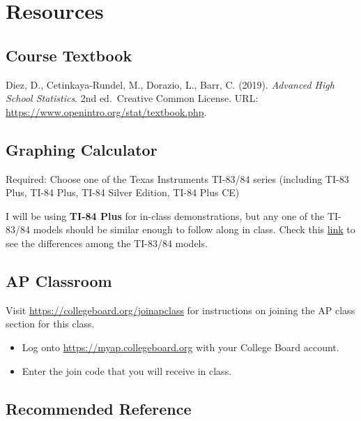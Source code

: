 \documentclass[12pt,fleqn]{article}
\begin{document}
\hypertarget{resources}{%
\section{Resources}\label{resources}}

\hypertarget{course-textbook}{%
\subsection{Course Textbook}\label{course-textbook}}

Diez, D., Cetinkaya-Rundel, M., Dorazio, L., Barr, C. (2019).
\emph{Advanced High School Statistics}. 2nd ed.~Creative Common
License. URL:
\url{https://www.openintro.org/stat/textbook.php}.

\hypertarget{graphing-calculator}{%
\subsection{Graphing Calculator}\label{graphing-calculator}}

Required: Choose one of the Texas Instruments TI-83/84 series (including TI-83 Plus, TI-84 Plus, TI-84 Silver Edition, TI-84 Plus CE)

I will be using \textbf{TI-84 Plus} for in-class demonstrations, but any one of the TI-83/84 models should be similar enough to follow along in class. Check this \href{https://brownmath.com/ti83/diff8384.htm\#PlusSilver}{link} to see the differences among the TI-83/84 models.

\hypertarget{ap-classroom}{%
\subsection{AP Classroom}\label{ap-classroom}}

Visit \url{https://collegeboard.org/joinapclass} for instructions on joining the AP class section for this class.

\begin{itemize}
\item
  Log onto \url{https://myap.collegeboard.org} with your College Board account.
\item
  Enter the join code that you will receive in class.
\end{itemize}

\hypertarget{recommended-reference}{%
\subsection{Recommended Reference}\label{recommended-reference}}
\end{document}
